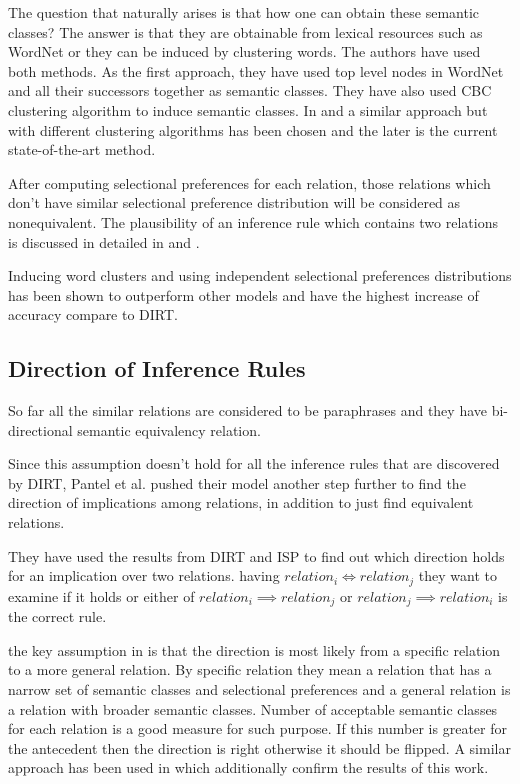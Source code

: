 \documentclass[12pt]{report}
\begin{document}
The question that naturally arises is that how one can obtain these semantic classes? The answer is that
they are obtainable from lexical resources such as WordNet or they can be induced by clustering words.
The authors have used both methods. As the first approach, they have used top level nodes in WordNet and all their successors together
as semantic classes. They have also used CBC clustering algorithm \cite{Pantel2002} to induce semantic classes. 
In \cite{Brown1992} and \cite{Lin2009} a similar approach but with different clustering algorithms has been chosen 
and the later is the current state-of-the-art method. 

After computing selectional preferences for each relation, those relations which don't have similar selectional preference
distribution will be considered as nonequivalent. The plausibility of an inference rule which contains two relations is
discussed in detailed in \cite{Bhagat2007} and \cite{Kotlerman2010} .

Inducing word clusters and using independent selectional preferences distributions has been shown to outperform other models
and have the highest increase of accuracy compare to DIRT.     

\subsection{Direction of Inference Rules}
\label{ch:improve}
So far all the similar relations are considered to be paraphrases and they have bi-directional semantic equivalency relation.

Since this assumption doesn't hold for all the inference rules that are discovered by DIRT, Pantel et al. pushed their model
another step further to find the direction of implications among relations, in addition to just find equivalent relations.

They have used the results from DIRT and ISP to find out which direction holds for an implication over two relations.
having $relation_i \iff relation_j$ they want to examine if it holds or either of $relation_i \implies relation_j$
or $relation_j \implies relation_i$ is the correct rule. 

the key assumption in \cite{Bhagat2007} is that the direction is most likely from a specific relation to a more general relation.
By specific relation they mean a relation that has a narrow set of semantic classes and selectional preferences and 
a general relation is a relation with broader semantic classes. Number of acceptable semantic classes for each relation is a 
good measure for such purpose. If this number is greater for the antecedent then the direction is right otherwise it should be flipped.
A similar approach has been used in \cite{Kotlerman2010} which additionally confirm the results of this work.
\end{document}
